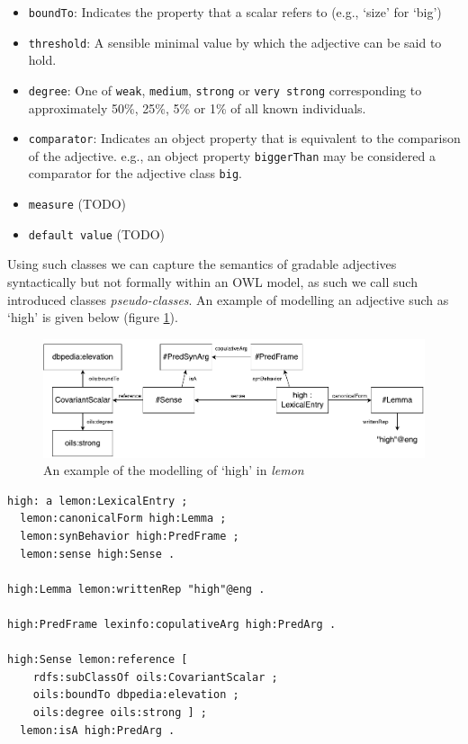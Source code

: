 \documentclass[11pt]{article}
\begin{document}
\begin{itemize}
	\item {\tt boundTo}: Indicates the property that a scalar refers to (e.g., `size' for `big')
	\item {\tt threshold}: A sensible minimal value by which the adjective can be said to hold.
	\item {\tt degree}: One of {\tt weak}, {\tt medium}, {\tt strong} or {\tt very strong} corresponding to approximately 50\%, 25\%, 5\% or 1\% of all known individuals.
	\item {\tt comparator}: Indicates an object property that is equivalent to the comparison of the adjective. e.g., an object property {\tt biggerThan} may be considered a comparator for the adjective class {\tt big}.
	\item {\tt measure} (TODO)
	\item {\tt default value} (TODO)
\end{itemize}

Using such classes we can capture the semantics of gradable adjectives syntactically but not formally within an OWL model, as such we call such introduced classes \emph{pseudo-classes}. An example of modelling an adjective such as `high' is given below (figure \ref{high-example}).

\begin{figure}
\includegraphics[width=\textwidth]{high-example}
\caption{An example of the modelling of `high' in \emph{lemon}\label{high-example}}
\end{figure}

\begin{verbatim}
high: a lemon:LexicalEntry ;
  lemon:canonicalForm high:Lemma ;
  lemon:synBehavior high:PredFrame ;
  lemon:sense high:Sense .

high:Lemma lemon:writtenRep "high"@eng .

high:PredFrame lexinfo:copulativeArg high:PredArg .

high:Sense lemon:reference [
    rdfs:subClassOf oils:CovariantScalar ;
    oils:boundTo dbpedia:elevation ;
    oils:degree oils:strong ] ;
  lemon:isA high:PredArg .
\end{verbatim}
\end{document}
